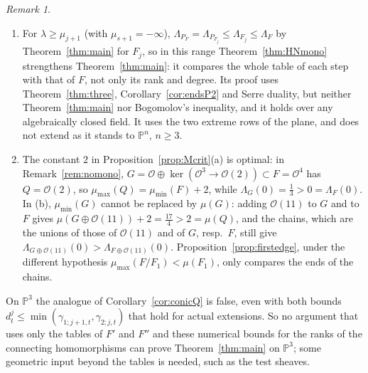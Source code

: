 \documentclass[11pt]{amsart}
\theoremstyle{definition}
\theoremstyle{remark}
\newtheorem{remark}[theorem]{Remark}
\newcommand{\PP}{\mathbb{P}}
\newcommand{\OO}{\mathcal{O}}
\begin{document}
\begin{remark}\label{rem:HNmono}
\begin{enumerate}[label=(\arabic*)]
\item For $\lambda\ge\mu_{j+1}$ (with $\mu_{s+1}=-\infty$), $\Lambda_{P_F}=\Lambda_{P_{F_j}}\le\Lambda_{F_j}\le\Lambda_F$ by Theorem~\ref{thm:main} for $F_j$, so in this range Theorem~\ref{thm:HNmono} strengthens Theorem~\ref{thm:main}: it compares the whole table of each step with that of $F$, not only its rank and degree. Its proof uses Theorem~\ref{thm:three}, Corollary~\ref{cor:endsP2} and Serre duality, but neither Theorem~\ref{thm:main} nor Bogomolov's inequality, and it holds over any algebraically closed field. It uses the two extreme rows of the plane, and does not extend as it stands to $\PP^n$, $n\ge3$.
\item The constant $2$ in Proposition~\ref{prop:Mcrit}(a) is optimal: in Remark~\ref{rem:nomono}, $G=\OO\oplus\ker(\OO^3\to\OO(2))\subset F=\OO^4$ has $Q=\OO(2)$, so $\mu_{\max}(Q)=\mu_{\min}(F)+2$, while $\Lambda_G(0)=\frac13>0=\Lambda_F(0)$. In (b), $\mu_{\min}(G)$ cannot be replaced by $\mu(G)$: adding $\OO(11)$ to $G$ and to $F$ gives $\mu(G\oplus\OO(11))+2=\frac{17}4>2=\mu(Q)$, and the chains, which are the unions of those of $\OO(11)$ and of $G$, resp.\ $F$, still give $\Lambda_{G\oplus\OO(11)}(0)>\Lambda_{F\oplus\OO(11)}(0)$. Proposition~\ref{prop:firstedge}, under the different hypothesis $\mu_{\max}(F/F_1)<\mu(F_1)$, only compares the ends of the chains.
\end{enumerate}
\end{remark}

On $\PP^3$ the analogue of Corollary~\ref{cor:conicQ} is false, even with both bounds $d^j_t\le\min(\gamma_{1;j+1,t},\gamma_{2;j,t})$ that hold for actual extensions. So no argument that uses only the tables of $F'$ and $F''$ and these numerical bounds for the ranks of the connecting homomorphisms can prove Theorem~\ref{thm:main} on $\PP^3$; some geometric input beyond the tables is needed, such as the test sheaves.
\end{document}
